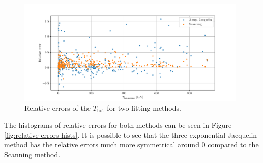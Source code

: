 \begin{figure}[ht]
	\centering
	\includegraphics[width=0.98\textwidth]{figures/relative-error2}
	\caption{Relative errors of the $T_\mathrm{hot}$ for two fitting methods.}
	\label{fig:relative-errors}
\end{figure}

The histograms of relative errors for both methods can be seen in Figure \ref{fig:relative-errors-hists}. It is possible to see that the three-exponential Jacquelin method has the relative errors much more symmetrical around 0 compared to the Scanning method.

